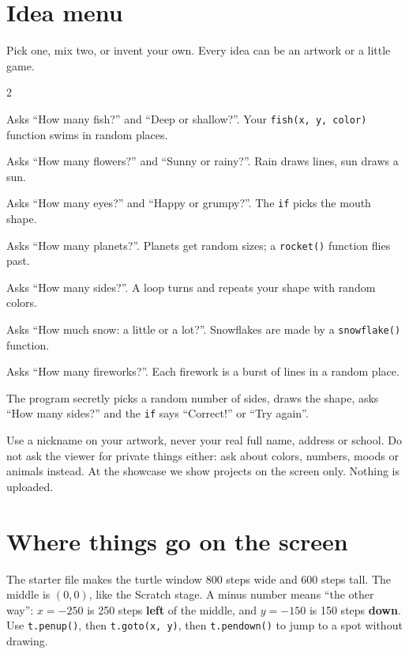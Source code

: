 \documentclass[level=1]{kidscode}
\begin{document}
\section{Idea menu}
Pick one, mix two, or invent your own. Every idea can be an artwork or a little game.

\begin{multicols}{2}
\begin{description}[leftmargin=0pt,itemsep=4pt,font=\bfseries]
  \item[Underwater world] Asks \enquote{How many fish?} and \enquote{Deep or shallow?}. Your \texttt{fish(x, y, color)} function swims in random places.
  \item[Flower garden] Asks \enquote{How many flowers?} and \enquote{Sunny or rainy?}. Rain draws lines, sun draws a sun.
  \item[Monster maker] Asks \enquote{How many eyes?} and \enquote{Happy or grumpy?}. The \texttt{if} picks the mouth shape.
  \item[Space trip] Asks \enquote{How many planets?}. Planets get random sizes; a \texttt{rocket()} function flies past.
  \item[Kaleidoscope] Asks \enquote{How many sides?}. A loop turns and repeats your shape with random colors.
  \item[Snow day] Asks \enquote{How much snow: a little or a lot?}. Snowflakes are made by a \texttt{snowflake()} function.
  \item[Fireworks show] Asks \enquote{How many fireworks?}. Each firework is a burst of lines in a random place.
  \item[Guess-the-shape game] The program secretly picks a random number of sides, draws the shape, asks \enquote{How many sides?} and the \texttt{if} says \enquote{Correct!} or \enquote{Try again}.
\end{description}
\end{multicols}

\begin{safety}
Use a nickname on your artwork, never your real full name, address or school.
Do not ask the viewer for private things either: ask about colors, numbers, moods or animals instead.
At the showcase we show projects on the screen only. Nothing is uploaded.
\end{safety}

\section{Where things go on the screen}
The starter file makes the turtle window 800 steps wide and 600 steps tall. The middle is $(0, 0)$,
like the Scratch stage. A minus number means \enquote{the other way}: $x = -250$ is 250 steps
\textbf{left} of the middle, and $y = -150$ is 150 steps \textbf{down}.
Use \texttt{t.penup()}, then \texttt{t.goto(x, y)}, then \texttt{t.pendown()} to jump to a spot without drawing.
\end{document}
